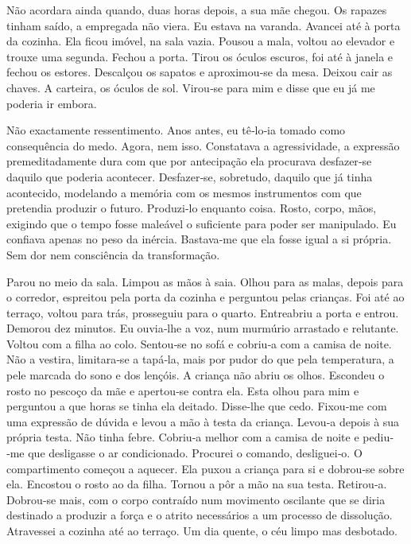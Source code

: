 Não acordara ainda quando, duas horas depois, a sua mãe chegou. Os
rapazes tinham saído, a empregada não viera. Eu estava na varanda.
Avancei até à porta da cozinha. Ela ficou imóvel, na sala vazia. Pousou
a mala, voltou ao elevador e trouxe uma segunda. Fechou a porta. Tirou
os óculos escuros, foi até à janela e fechou os estores. Descalçou os
sapatos e aproximou­‑se da mesa. Deixou cair as chaves. A carteira, os
óculos de sol. Virou­‑se para mim e disse que eu já me poderia ir
embora.

Não exactamente ressentimento. Anos antes, eu tê­‑lo­‑ia tomado como
consequência do medo. Agora, nem isso. Constatava a agressividade, a
expressão premeditadamente dura com que por antecipação ela procurava
desfazer­‑se daquilo que poderia acontecer. Desfazer­‑se, sobretudo,
daquilo que já tinha acontecido, modelando a memória com os mesmos
instrumentos com que pretendia produzir o futuro. Produzi­‑lo enquanto
coisa. Rosto, corpo, mãos, exigindo que o tempo fosse maleável o
suficiente para poder ser manipulado. Eu confiava apenas no peso da
inércia. Bastava­‑me que ela fosse igual a si própria. Sem dor nem
consciência da transformação.

Parou no meio da sala. Limpou as mãos à saia. Olhou para as malas,
depois para o corredor, espreitou pela porta da cozinha e perguntou
pelas crianças. Foi até ao terraço, voltou para trás, prosseguiu para o
quarto. Entreabriu a porta e entrou. Demorou dez minutos. Eu ouvia­‑lhe
a voz, num murmúrio arrastado e relutante. Voltou com a filha ao colo.
Sentou­‑se no sofá e cobriu­‑a com a camisa de noite. Não a vestira,
limitara­‑se a tapá­‑la, mais por pudor do que pela temperatura, a pele
marcada do sono e dos lençóis. A criança não abriu os olhos. Escondeu o
rosto no pescoço da mãe e apertou­‑se contra ela. Esta olhou para mim e
perguntou a que horas se tinha ela deitado. Disse­‑lhe que cedo.
Fixou­‑me com uma expressão de dúvida e levou a mão à testa da criança.
Levou­‑a depois à sua própria testa. Não tinha febre. Cobriu­‑a melhor
com a camisa de noite e pediu­‑me que desligasse o ar condicionado.
Procurei o comando, desliguei­‑o. O compartimento começou a aquecer. Ela
puxou a criança para si e dobrou­‑se sobre ela. Encostou o rosto ao da
filha. Tornou a pôr a mão na sua testa. Retirou­‑a. Dobrou­‑se mais, com
o corpo contraído num movimento oscilante que se diria destinado a
produzir a força e o atrito necessários a um processo de dissolução.
Atravessei a cozinha até ao terraço. Um dia quente, o céu limpo mas
desbotado.


